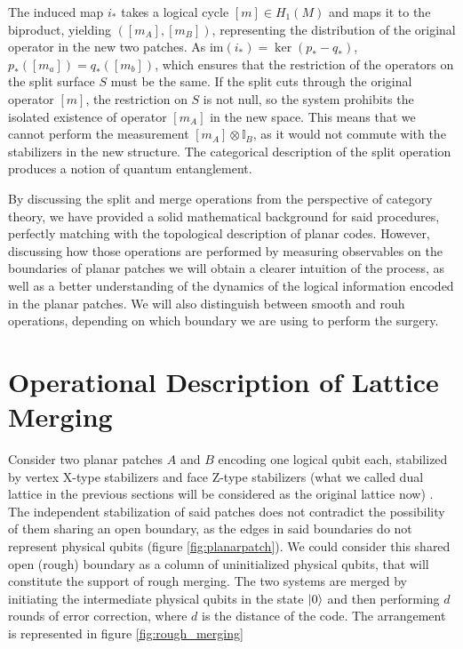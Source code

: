 \documentclass[12pt, twoside, openany]{book}
\begin{document}
The induced map $i_*$ takes a logical cycle $[m] \in H_1(M)$ and maps it to the biproduct, yielding $([m_A], [m_B])$, representing the distribution of the original operator in the new two patches. As $\text{im}(i_*) = \ker (p_* - q_*)$, $p_*([m_a]) = q_*([m_b])$, which ensures that the restriction of the operators on the split surface $S$ must be the same. If the split cuts through the original operator $[m]$, the restriction on $S$ is not null, so the system prohibits the isolated existence of operator $[m_A]$ in the new space. This means that we cannot perform the measurement $[m_A] \otimes \mathbb{I}_B$, as it would not commute with the stabilizers in the new structure. The categorical description of the split operation produces a notion of quantum entanglement. 

By discussing the split and merge operations from the perspective of category theory, we have provided a solid mathematical background for said procedures, perfectly matching with the topological description of planar codes. However, discussing how those operations are performed by measuring observables on the boundaries of planar patches we will obtain a clearer intuition of the process, as well as a better understanding of the dynamics of the logical information encoded in the planar patches. We will also distinguish between smooth and rouh operations, depending on which boundary we are using to perform the surgery. \\

\section{Operational Description of Lattice Merging}

Consider two planar patches $A$ and $B$ encoding one logical qubit each, stabilized by vertex X-type stabilizers and face Z-type stabilizers (what we called dual lattice in the previous sections will be considered as the original lattice now) \Cite{Horsman2012}. The independent stabilization of said patches does not contradict the possibility of them sharing an open boundary, as the edges in said boundaries do not represent physical qubits (figure \ref{fig:planarpatch}). We could consider this shared open (rough) boundary as a column of uninitialized physical qubits, that will constitute the support of rough merging. The two systems are merged by initiating the intermediate physical qubits in the state $\ket{0}$ and then performing $d$ rounds of error correction, where $d$ is the distance of the code. The arrangement is represented in figure \ref{fig:rough_merging}
\end{document}
